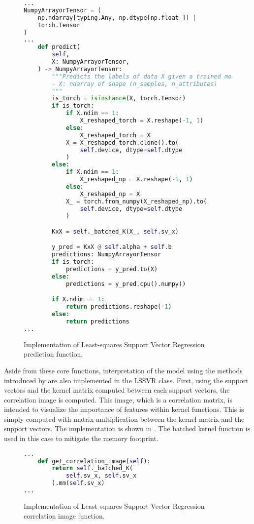 \begin{figure}[H]
  \centering
  \begin{lstlisting}[language=Python]
...
NumpyArrayorTensor = (
    np.ndarray[typing.Any, np.dtype[np.float_]] |
    torch.Tensor
)
...
    def predict(
        self,
        X: NumpyArrayorTensor,
    ) -> NumpyArrayorTensor:
        """Predicts the labels of data X given a trained model.
        - X: ndarray of shape (n_samples, n_attributes)
        """
        is_torch = isinstance(X, torch.Tensor)
        if is_torch:
            if X.ndim == 1:
                X_reshaped_torch = X.reshape(-1, 1)
            else:
                X_reshaped_torch = X
            X_= X_reshaped_torch.clone().to(
                self.device, dtype=self.dtype
            )
        else:
            if X.ndim == 1:
                X_reshaped_np = X.reshape(-1, 1)
            else:
                X_reshaped_np = X
            X_ = torch.from_numpy(X_reshaped_np).to(
                self.device, dtype=self.dtype
            )

        KxX = self._batched_K(X_, self.sv_x)

        y_pred = KxX @ self.alpha + self.b
        predictions: NumpyArrayorTensor
        if is_torch:
            predictions = y_pred.to(X)
        else:
            predictions = y_pred.cpu().numpy()

        if X.ndim == 1:
            return predictions.reshape(-1)
        else:
            return predictions
...
  \end{lstlisting}
  \caption{Implementation of Least-squares Support Vector Regression prediction function.}\label{fig:lssvr_predict_function_impl}
\end{figure}

Aside from these core functions, interpretation of the model using the methods introduced by \textcite{ustunVisualisationInterpretationSupport2007} are also implemented in the LSSVR class. First, using the support vectors and the kernel matrix computed between each support vectors, the correlation image is computed. This image, which is a correlation matrix, is intended to visualize the importance of features within kernel functions. This is simply computed with matrix multiplication between the kernel matrix and the support vectors. The implementation is shown in . The batched kernel function is used in this case to mitigate the memory footprint.

\begin{figure}[H]
  \centering
  \begin{lstlisting}[language=Python]
...
    def get_correlation_image(self):
        return self._batched_K(
            self.sv_x, self.sv_x
        ).mm(self.sv_x)
...
  \end{lstlisting}
  \caption{Implementation of Least-squares Support Vector Regression correlation image function.}\label{fig:lssvr_correlation_image_function_impl}
\end{figure}

